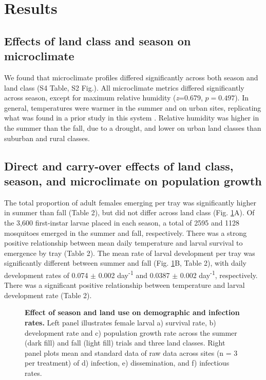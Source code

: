 \documentclass[12pt]{article}
\begin{document}
\section{Results}

\subsection{Effects of land class and season on microclimate}

We found that microclimate profiles differed significantly across both season and land class (S4 Table, S2 Fig.). All microclimate metrics differed significantly across season, except for maximum relative humidity (\textit{z}=0.679, $p=0.497$). In general, temperatures were warmer in the summer and on urban sites, replicating what was found in a prior study in this system \citep{murdock2017}. Relative humidity was higher in the summer than the fall, due to a drought, and lower on urban land classes than suburban and rural classes.

\subsection{Direct and carry-over effects of land class, season, and microclimate on population growth}

The total proportion of adult females emerging per tray was significantly higher in summer than fall (Table 2), but did not differ across land class (Fig. \ref{Fig:1}A). Of the 3,600 first-instar larvae placed in each season, a total of 2595 and 1128 mosquitoes emerged in the summer and fall, respectively. There was a strong positive relationship between mean daily temperature and larval survival to emergence by tray (Table 2). The mean rate of larval development per tray was significantly different between summer and fall (Fig. \ref{Fig:1}B, Table 2), with daily development rates of 0.074 $\pm$ 0.002 day\textsuperscript{-1} and 0.0387 $\pm$ 0.002 day\textsuperscript{-1}, respectively. There was a significant positive relationship between temperature and larval development rate (Table 2).

\begin{figure}
\centering
\caption{\textbf{Effect of season and land use on demographic and infection rates.} Left panel illustrates female larval a) survival rate, b) development rate and c) population growth rate across the summer (dark fill) and fall (light fill) trials and three land classes. Right panel plots mean and standard data of raw data across sites (n = 3 per treatment) of d) infection, e) dissemination, and f) infectious rates.}
\label{Fig:1}
\end{figure}
\end{document}
